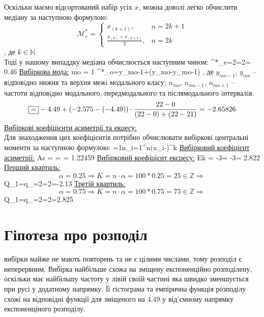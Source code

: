 \documentclass[14pt,a4paper]{scrartcl}
\begin{document}
Оскільки маємо відсортований набір усіх $x$, можна доволі легко обчислити медіану за наступною формулою:
$$\mathcal{M}^*_e=
\left\{\begin{array}{ll}
  x_{(k+1)}, & n=2k+1\\
  \frac{x_{(k)}+x_{(k+1)}}2, & n=2k
\end{array}\right.$$
, де $k\in\mathbb{N}$\\
Тоді у нашому випаддку медіана обчислюється наступним чином:
\be
  ^*_e=2=2=
  0.46
\ee
\underline{Вибіркова мода:}
\be
  mo = 1 
\ee
\be
  ^*_o=y_{mo-1}+(y_{mo}-y_{mo-1})\cdot
  \fbox{=}
\ee
, де $y_{mo-1}$, $y_{mo}$ – вiдповiдно нижня та верхня межi модального класу; $n_{mo}$, $n_{mo-1}$, $n_{mo+1}$ –
частоти вiдповiдно модального, передмодального та пiслямодального iнтервалiв.\newpage
$$
  \fbox{=}-4.49+(-2.575-(-4.49))\cdot
  \frac{22-0}{(22-0)+(22-21)} = -2.65826
$$
\underline{Вибіркові коефіцієнти асиметрії та екцесу:}\\

Для знаходження цих коефіцієнтів потрібно обчислювати вибіркові центральні моменти за наступною формулою:
\be
  =\frac1n\sum\limits_{i=1}^n(x_i-)^k
\ee
\underline{Вибірковий коефіцієнт асиметрії:}
\be
  As = =
  =
  1.22459
\ee
\underline{Вибірковий коефіцієнт ексцесу:}
\be
  Ek = -3=
  -3=
  2.822
\ee
\underline{Перший квартиль:}
$$\alpha=0.25\Rightarrow
K = n\cdot\alpha=100*0.25=25\in\mathbb{Z}\Rightarrow$$
\be\Rightarrow Q_1=q_\alpha=2=2=-2.13\ee
\underline{Третій квартиль:}
$$\alpha=0.75\Rightarrow
K = n\cdot\alpha=100*0.75=75\in\mathbb{Z}\Rightarrow$$
\be\Rightarrow Q_1=q_\alpha=2=2=2.825\ee

\newpage
\section{Гіпотеза про розподіл}

 вибірки майже не мають повторень та не є цілими числами, тому розподіл є неперервним. Вибірка найбільше схожа на зміщену експоненційно розподілену, оскільки має найбільшу частоту у лівій своїй частині яка швидко зменшується при русі у додатному напрямку. Її гістограма та емпірична функція розподілу схожі на відповідні функції для зміщеного на 4.49 у від'ємному напрямку експоненціного розподілу.\\
\end{document}
